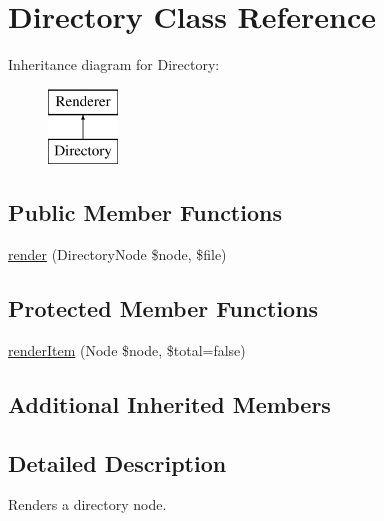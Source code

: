 \hypertarget{class_sebastian_bergmann_1_1_code_coverage_1_1_report_1_1_html_1_1_directory}{}\section{Directory Class Reference}
\label{class_sebastian_bergmann_1_1_code_coverage_1_1_report_1_1_html_1_1_directory}
Inheritance diagram for Directory\+:\begin{figure}[H]
\begin{center}
\leavevmode
\includegraphics[height=2.000000cm]{class_sebastian_bergmann_1_1_code_coverage_1_1_report_1_1_html_1_1_directory}
\end{center}
\end{figure}
\subsection*{Public Member Functions}
\begin{DoxyCompactItemize}
\item 
\mbox{\hyperlink{class_sebastian_bergmann_1_1_code_coverage_1_1_report_1_1_html_1_1_directory_a9d0de8c73a83875e31c34f3dfbbebbc9}{render}} (Directory\+Node \$node, \$file)
\end{DoxyCompactItemize}
\subsection*{Protected Member Functions}
\begin{DoxyCompactItemize}
\item 
\mbox{\hyperlink{class_sebastian_bergmann_1_1_code_coverage_1_1_report_1_1_html_1_1_directory_a4c106da37e16675535a23f3c94663351}{render\+Item}} (Node \$node, \$total=false)
\end{DoxyCompactItemize}
\subsection*{Additional Inherited Members}


\subsection{Detailed Description}
Renders a directory node. 

